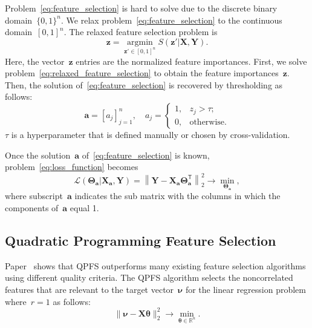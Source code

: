 \documentclass[12pt,twoside]{article}
\theoremstyle{definition}
\newcommand{\ba}{\mathbf{a}}
\newcommand{\bz}{\mathbf{z}}
\newcommand{\bY}{\mathbf{Y}}
\newcommand{\bX}{\mathbf{X}}
\newcommand{\bbR}{\mathbb{R}}
\newcommand{\T}{\mathsf{T}}
\newcommand{\bnu}{\boldsymbol{\nu}}
\newcommand{\btheta}{\boldsymbol{\theta}}
\newcommand{\bTheta}{\boldsymbol{\Theta}}
\newcommand{\argmin}{\mathop{\arg \min}\limits}
\begin{document}
Problem~\eqref{eq:feature_selection} is hard to solve due to the discrete binary domain~$\{0, 1\}^n$. We relax problem~\eqref{eq:feature_selection} to the continuous domain~$[0, 1]^n$. The relaxed feature selection problem is
\begin{equation}
\bz = \argmin_{\bz' \in [0, 1]^n} S(\bz' | \bX, \bY).
\label{eq:relaxed_feature_selection}
\end{equation}
Here, the vector~$\bz$ entries are the normalized feature importances.
First, we solve problem~\eqref{eq:relaxed_feature_selection} to obtain the feature importances~$\bz$. 
Then, the solution of~\eqref{eq:feature_selection} is recovered by thresholding as follows:
\begin{equation*}
\ba = [a_j]_{j=1}^n, \quad 
a_j = \begin{cases}
1, & z_j > \tau; \\
0, & \text{otherwise}.
\end{cases}
\end{equation*}
$\tau$ is a hyperparameter that is defined manually or chosen by cross-validation. 

Once the solution~$\ba$ of~\eqref{eq:feature_selection} is known, problem~\eqref{eq:loss_function} becomes
\begin{equation*}
\mathcal{L}(\bTheta_{\ba} | \bX_{\ba}, \bY) = {\left\| \mathbf{Y} - \bX_{\ba}\bTheta^{\T}_{\ba} \right\| }_2^2 \rightarrow\min_{\bTheta_{\ba}},
\end{equation*}
where subscript~$\ba$ indicates the sub matrix with the columns in which the components of~$\ba$ equal 1.

\subsection{Quadratic Programming Feature Selection}

Paper~\cite{katrutsa2017comprehensive} shows that QPFS outperforms many existing feature selection algorithms using different quality criteria.
The QPFS algorithm selects the noncorrelated features that are relevant to the target vector~$\bnu$ for the linear regression problem where~$r=1$ as follows:
\begin{equation*}
\| \bnu - \bX \btheta\|_2^2 \rightarrow\min_{\btheta \in \bbR^{n}}.
\end{equation*}
\end{document}

